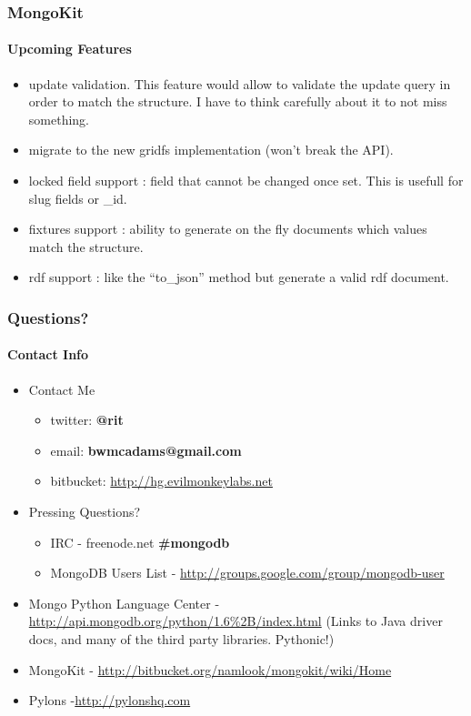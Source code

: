 \documentclass{beamer}
\begin{document}
\begin{frame}
\frametitle{MongoKit}
\framesubtitle{Upcoming Features}
\begin{itemize}
	\item update validation. This feature would allow to validate the update query in order to match the structure. I have to think carefully about it to not miss something. 
	\item migrate to the new gridfs implementation (won't break the API). 
	\item locked field support : field that cannot be changed once set. This is usefull for slug fields or \_id. 
	\item fixtures support : ability to generate on the fly documents which values match the structure. 
	\item rdf support : like the ``to\_json'' method but generate a valid rdf document. 
\end{itemize}
\end{frame}

\begin{frame}
\frametitle{Questions?}
\framesubtitle{Contact Info}
    \begin{itemize}
        \item Contact Me
        \begin{itemize}
            \item twitter: {\bf @rit}
            \item email: {\bf bwmcadams@gmail.com}	
			\item bitbucket: \url{http://hg.evilmonkeylabs.net}
        \end{itemize}
        \item Pressing Questions?
        \begin{itemize}
            \item IRC - {freenode.net \bf\#mongodb}
            \item MongoDB Users List - \url{http://groups.google.com/group/mongodb-user}
        \end{itemize}
    \item Mongo Python Language Center - \url{http://api.mongodb.org/python/1.6\%2B/index.html} {(\tiny Links to Java driver docs, and many of the third party libraries. Pythonic!)}
        \item MongoKit - \url{http://bitbucket.org/namlook/mongokit/wiki/Home}
        \item Pylons -\url{http://pylonshq.com}
    \end{itemize}
\end{frame}
\end{document}
